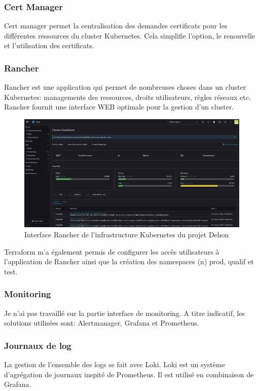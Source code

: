 \documentclass[12pt, a4paper, twoside]{article}
\begin{document}
\subsubsection{Cert Manager}
Cert manager permet la centralisation des demandes certificats pour les différentes ressources du \gls{cluster} \gls{Kubernetes}.
Cela simplifie l'option, le renouvelle et l'utilisation des certificats.

\subsubsection{Rancher}
Rancher est une application qui permet de nombreuses choses dans un \gls{cluster} \gls{Kubernetes}: managements des ressources, droits utilisateurs, règles réseaux etc. 
Rancher fournit une interface WEB optimale pour la gestion d'un \gls{cluster}.

\begin{figure}[!ht]
    \centering
        \includegraphics[width=\textwidth]{src/interface_rancher.png}
    \caption{Interface Rancher de l'infrastructure \gls{Kubernetes} du projet Dehon}
    \label{fig:rancher_interface}
\end{figure}

\gls{Terraform} m'a également permis de configurer les accès utilisateurs à l'application de Rancher ainsi que la création des namespaces (n) prod, qualif et test.

\subsubsection{Monitoring}
Je n'ai pas travaillé sur la partie interface de monitoring.
A titre indicatif, les solutions utilisées sont: Alertmanager, Grafana et Prometheus.

\subsubsection{Journaux de log}
La gestion de l'ensemble des logs se fait avec Loki.
Loki est un système d'agrégation de journaux inspité de Prometheus.
Il est utilisé en combinaison de Grafana.
\end{document}

